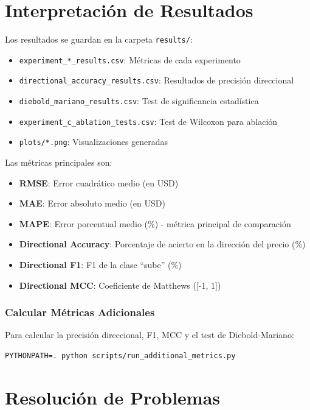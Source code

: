 \section{Interpretación de Resultados}

Los resultados se guardan en la carpeta \texttt{results/}:

\begin{itemize}
    \item \texttt{experiment\_*\_results.csv}: Métricas de cada experimento
    \item \texttt{directional\_accuracy\_results.csv}: Resultados de precisión direccional
    \item \texttt{diebold\_mariano\_results.csv}: Test de significancia estadística
    \item \texttt{experiment\_c\_ablation\_tests.csv}: Test de Wilcoxon para ablación
    \item \texttt{plots/*.png}: Visualizaciones generadas
\end{itemize}

Las métricas principales son:
\begin{itemize}
    \item \textbf{RMSE}: Error cuadrático medio (en USD)
    \item \textbf{MAE}: Error absoluto medio (en USD)
    \item \textbf{MAPE}: Error porcentual medio (\%) - métrica principal de comparación
    \item \textbf{Directional Accuracy}: Porcentaje de acierto en la dirección del precio (\%)
    \item \textbf{Directional F1}: F1 de la clase ``sube'' (\%)
    \item \textbf{Directional MCC}: Coeficiente de Matthews ([-1, 1])
\end{itemize}

\subsubsection{Calcular Métricas Adicionales}
Para calcular la precisión direccional, F1, MCC y el test de Diebold-Mariano:
\begin{verbatim}
PYTHONPATH=. python scripts/run_additional_metrics.py
\end{verbatim}

\section{Resolución de Problemas}

